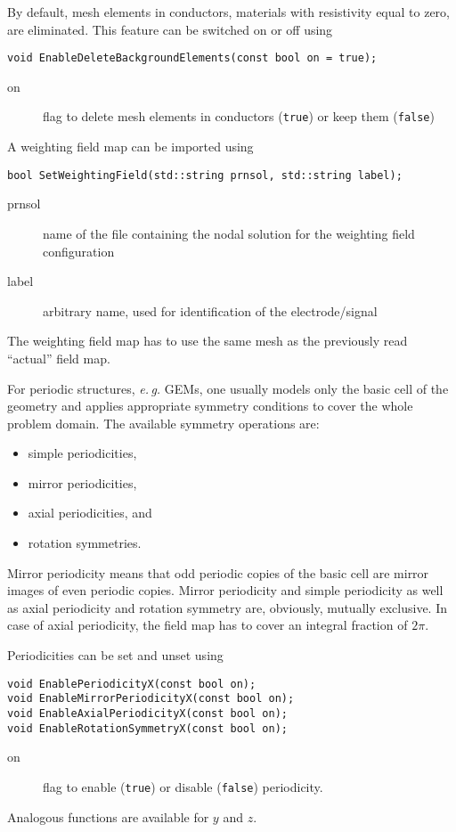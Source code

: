 By default, mesh elements in conductors, \ie materials 
with resistivity equal to zero, are eliminated. This feature can be 
switched on or off using
\begin{lstlisting}
void EnableDeleteBackgroundElements(const bool on = true);
\end{lstlisting}
\begin{description}
  \item[on] flag to delete mesh elements in conductors (\texttt{true}) or keep them (\texttt{false}) 
\end{description}
A weighting field map can be imported using
\begin{lstlisting}
bool SetWeightingField(std::string prnsol, std::string label);
\end{lstlisting}
\begin{description}
  \item[prnsol]
  name of the file containing the nodal solution for the weighting field
  configuration
  \item[label]
  arbitrary name, used for identification of the electrode/signal
\end{description}

The weighting field map has to use the same mesh as the previously 
read ``actual'' field map.

For periodic structures, \textit{e.\,g.} GEMs, one usually models only 
the basic cell of the geometry and applies appropriate symmetry 
conditions to cover the whole problem domain. 
The available symmetry operations are:
\begin{itemize}
  \item
  simple periodicities,
  \item
  mirror periodicities, 
  \item
  axial periodicities, and
  \item
  rotation symmetries.
\end{itemize}

Mirror periodicity means that odd periodic copies of the basic cell 
are mirror images of even periodic copies.
Mirror periodicity and simple periodicity as well as 
axial periodicity and rotation symmetry are, 
obviously, mutually exclusive. 
In case of axial periodicity, the field map has to cover an 
integral fraction of \(2\pi\). 

Periodicities can be set and unset using
\begin{lstlisting}
void EnablePeriodicityX(const bool on);
void EnableMirrorPeriodicityX(const bool on);
void EnableAxialPeriodicityX(const bool on);
void EnableRotationSymmetryX(const bool on);
\end{lstlisting}
\begin{description}
\item[on] flag to enable (\texttt{true}) or disable (\texttt{false}) periodicity. 
\end{description}
Analogous functions are available for \(y\) and \(z\).

